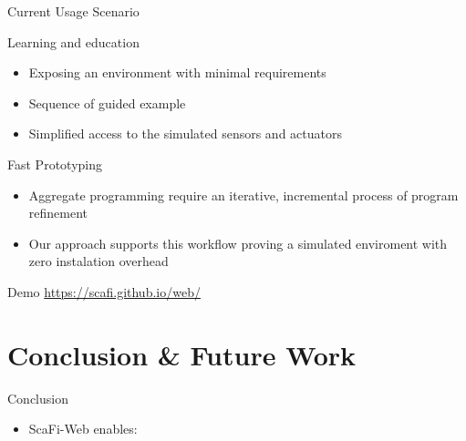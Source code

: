 \documentclass[presentation]{beamer}
\newcommand{\scafiweb}{{\sc{}ScaFi-Web}}
\begin{document}
\begin{frame}[fragile]{Current Usage Scenario}


\begin{block}{Learning and education}
  \begin{itemize}
  \item Exposing an environment with minimal requirements
  \item Sequence of guided example
  \item Simplified access to the simulated sensors and actuators
  \end{itemize}
\end{block}

\begin{block}{Fast Prototyping}
  \begin{itemize}
  \item Aggregate programming require an iterative, incremental process of program refinement
  \item Our approach supports this workflow proving a simulated enviroment with zero instalation overhead
  \end{itemize}
  
\end{block}

\end{frame}

\begin{frame}[fragile]{Demo}
  \centering
  \url{https://scafi.github.io/web/}

\end{frame}
  
\section{Conclusion \& Future Work}

\begin{frame}{Conclusion}

%
\begin{itemize}
\item \scafiweb{} enables:
\end{itemize}

\end{frame}
\end{document}
